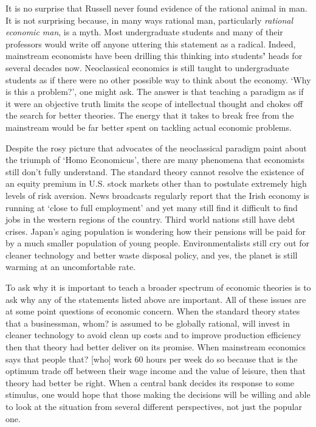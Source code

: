 \documentclass{ucthesis}
\begin{document}
It is no surprise that Russell never found evidence of the rational animal
in man. It is not surprising because, in many ways rational man,
particularly \textit{rational economic man}, is a myth. Most undergraduate
students and many of their professors would write off anyone uttering this
statement as a radical. Indeed, mainstream economists have been drilling
this thinking into students\textbf{'} heads for several decades now.
Neoclassical economics is still taught to undergraduate students as if there
were no other possible way to think about the economy. `Why is this a
problem?', one might ask. The answer is that teaching a paradigm as if it
were an objective truth limits the scope of intellectual thought and chokes
off the search for better theories. The energy that it takes to break free
from the mainstream would be far better spent on tackling actual economic
problems.

Despite the rosy picture that advocates of the neoclassical paradigm paint
about the triumph of `Homo Economicus', there are many phenomena that
economists still don't fully understand. The standard theory cannot resolve
the existence of an equity premium in U.S. stock markets other than to
postulate extremely high levels of risk aversion. News broadcasts regularly
report that the Irish economy is running at `close to full employment' and
yet many still find it difficult to find jobs in the western regions of the
country. Third world nations still have debt crises. Japan's aging
population is wondering how their pensions will be paid for by a much
smaller population of young people. Environmentalists still cry out for
cleaner technology and better waste disposal policy, and yes, the planet is
still warming at an uncomfortable rate.

To ask why it is important to teach a broader spectrum of economic theories
is to ask why any of the statements listed above are important. All of these
issues are at some point questions of economic concern. When the standard
theory states that a businessman, {\LARGE whom?} is assumed to be globally
rational, will invest in cleaner technology to avoid clean up costs and to
improve production efficiency then that theory had better deliver on its
promise. When mainstream economics says that people {\LARGE that? [who]}
work 60 hours per week do so because that is the optimum trade off between
their wage income and the value of leisure, then that theory had better be
right. When a central bank decides its response to some stimulus, one would
hope that those making the decisions will be willing and able to look at the
situation from several different perspectives, not just the popular one.
\end{document}
